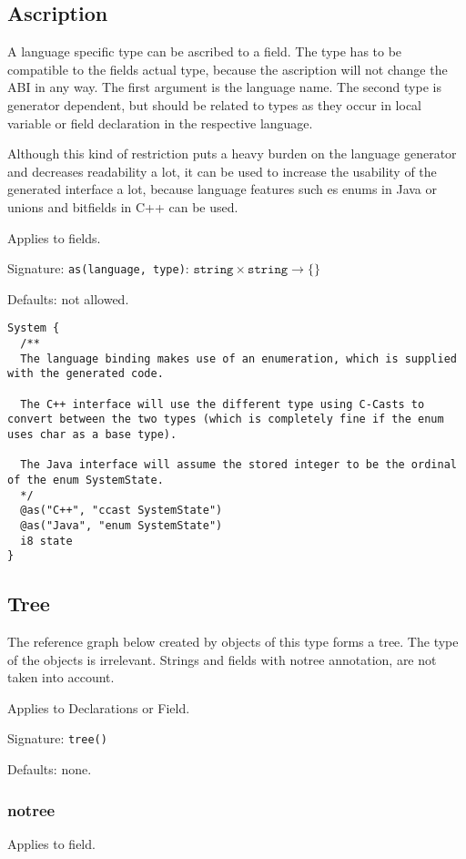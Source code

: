 \subsection*{Ascription}
A language specific type can be ascribed to a field. The type has to be compatible to the fields actual type, because the ascription will not change the ABI in any way. The first argument is the language name. The second type is generator dependent, but should be related to types as they occur in local variable or field declaration in the respective language.

Although this kind of restriction puts a heavy burden on the language generator and decreases readability a lot, it can be used to increase the usability of the generated interface a lot, because language features such es enums in Java or unions and bitfields in C++ can be used.

Applies to fields.

Signature: \verb/as(language, type)/: $\texttt{string} \times \texttt{string} → \{\}$

Defaults: not allowed.

\begin{lstlisting}[label=ascriptionExample,caption=Examples,language=skill]
System {
  /**
  The language binding makes use of an enumeration, which is supplied with the generated code.
  
  The C++ interface will use the different type using C-Casts to convert between the two types (which is completely fine if the enum uses char as a base type).
  
  The Java interface will assume the stored integer to be the ordinal of the enum SystemState.
  */
  @as("C++", "ccast SystemState")
  @as("Java", "enum SystemState")
  i8 state
}
\end{lstlisting}



\subsection*{Tree}
The reference graph below created by objects of this type forms a tree. The type of the objects is irrelevant. Strings and fields with notree annotation, are not taken into account.

Applies to Declarations or Field.

Signature: \verb/tree()/

Defaults: none.


\subsubsection*{notree}
Applies to field.

